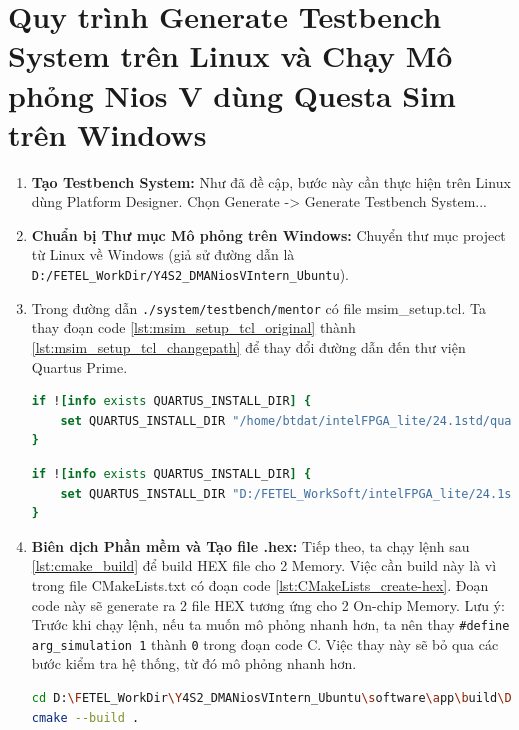 \FloatBarrier

\section{Quy trình Generate Testbench System trên Linux và Chạy Mô phỏng Nios V dùng Questa Sim trên Windows}
\label{sec:generate_tb_system}

\begin{enumerate}
    \item \textbf{Tạo Testbench System:} Như đã đề cập, bước này cần thực hiện trên Linux dùng Platform Designer. Chọn Generate -> Generate Testbench System...
    \item \textbf{Chuẩn bị Thư mục Mô phỏng trên Windows:} Chuyển thư mục project từ Linux về Windows (giả sử đường dẫn là \\ \texttt{D:/FETEL\_WorkDir/Y4S2\_DMANiosVIntern\_Ubuntu}).
    \item Trong đường dẫn \texttt{./system/testbench/mentor} có file msim\_setup.tcl. Ta thay đoạn code \ref{lst:msim_setup_tcl_original} thành \ref{lst:msim_setup_tcl_changepath} để thay đổi đường dẫn đến thư viện Quartus Prime.
    \begin{lstlisting}[language=tcl, caption={msim\_setup.tcl gốc}, label={lst:msim_setup_tcl_original}]
if ![info exists QUARTUS_INSTALL_DIR] {
    set QUARTUS_INSTALL_DIR "/home/btdat/intelFPGA_lite/24.1std/quartus/"
} \end{lstlisting}
    
    \begin{lstlisting}[language=tcl, caption={msim\_setup.tcl đã chỉnh sửa}, label={lst:msim_setup_tcl_changepath}]
if ![info exists QUARTUS_INSTALL_DIR] {
    set QUARTUS_INSTALL_DIR "D:/FETEL_WorkSoft/intelFPGA_lite/24.1std/quartus/"
} \end{lstlisting}

    \item \textbf{Biên dịch Phần mềm và Tạo file .hex:} Tiếp theo, ta chạy lệnh sau \ref{lst:cmake_build} để build HEX file cho 2 Memory. Việc cần build này là vì trong file CMakeLists.txt có đoạn code \ref{lst:CMakeLists_create-hex}. Đoạn code này sẽ generate ra 2 file HEX tương ứng cho 2 On-chip Memory. Lưu ý: Trước khi chạy lệnh, nếu ta muốn mô phỏng nhanh hơn, ta nên thay \texttt{\string#define arg\_simulation 1}  thành \texttt{0} trong đoạn code C. Việc thay này sẽ bỏ qua các bước kiểm tra hệ thống, từ đó mô phỏng nhanh hơn.
    \begin{lstlisting}[language=bash, caption={Chạy CMake để build HEX file cho 2 Memory}, label={lst:cmake_build}]
cd D:\FETEL_WorkDir\Y4S2_DMANiosVIntern_Ubuntu\software\app\build\Debug
cmake --build . \end{lstlisting}


\end{enumerate}

